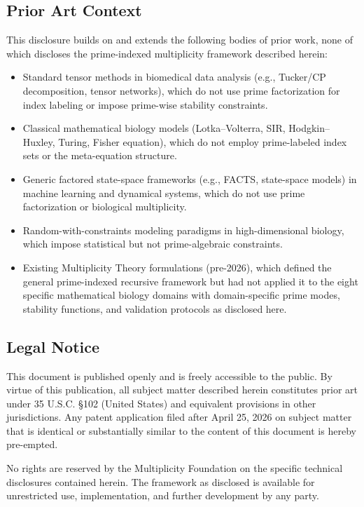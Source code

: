\documentclass[12pt,letterpaper]{article}
\begin{document}
\subsection{Prior Art Context}

This disclosure builds on and extends the following bodies of prior work,
none of which discloses the prime-indexed multiplicity framework described
herein:

\begin{itemize}[leftmargin=*]
  \item Standard tensor methods in biomedical data analysis (e.g.,
    Tucker/CP decomposition, tensor networks), which do not use prime
    factorization for index labeling or impose prime-wise stability
    constraints.
  \item Classical mathematical biology models (Lotka--Volterra, SIR,
    Hodgkin--Huxley, Turing, Fisher equation), which do not employ
    prime-labeled index sets or the meta-equation structure.
  \item Generic factored state-space frameworks (e.g., FACTS,
    state-space models) in machine learning and dynamical systems,
    which do not use prime factorization or biological multiplicity.
  \item Random-with-constraints modeling paradigms in high-dimensional
    biology, which impose statistical but not prime-algebraic constraints.
  \item Existing Multiplicity Theory formulations (pre-2026), which
    defined the general prime-indexed recursive framework but had not
    applied it to the eight specific mathematical biology domains with
    domain-specific prime modes, stability functions, and validation
    protocols as disclosed here.
\end{itemize}

\subsection{Legal Notice}

This document is published openly and is freely accessible to the public.
By virtue of this publication, all subject matter described herein
constitutes prior art under 35 U.S.C. \S 102 (United States) and
equivalent provisions in other jurisdictions. Any patent application filed
after April 25, 2026 on subject matter that is identical or substantially
similar to the content of this document is hereby pre-empted.

No rights are reserved by the Multiplicity Foundation on the specific
technical disclosures contained herein. The framework as disclosed is
available for unrestricted use, implementation, and further development
by any party.
\end{document}
